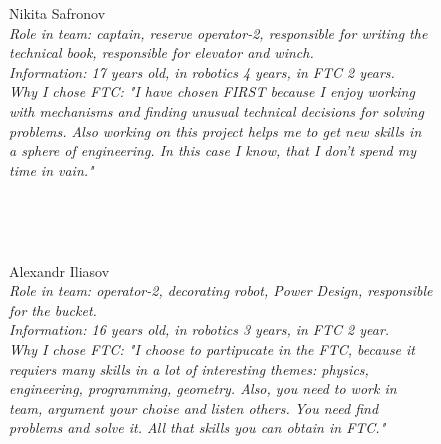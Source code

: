 \begin{figure}[H]
	\begin{minipage}{0.47\linewidth}
		Nikita Safronov\\
		\emph{Role in team: captain, reserve operator-2, responsible for writing the technical book, responsible for elevator and winch.\\}
		\emph{Information: 17 years old, in robotics 4 years, in FTC 2 years.\\} 
		\emph{Why I chose FTC: "I have chosen FIRST because I enjoy working with mechanisms and finding unusual technical decisions for solving problems. Also working on this project helps me to get new skills in a sphere of engineering. In this case I know, that I don't spend my time in vain."}				
	\end{minipage}
	\hfill
	\begin{minipage}{0.47\linewidth}
		\\
	\end{minipage}
\end{figure}

\begin{figure}[H]
	\begin{minipage}[h]{0.47\linewidth}
		\\
	\end{minipage}
	\hfill
	\begin{minipage}[h]{0.47\linewidth}
		Alexandr Iliasov \\
		\emph{Role in team: operator-2, decorating robot, Power Design, responsible for the bucket.\\}
		\emph{Information: 16 years old, in robotics 3 years, in FTC 2 year. \\}
		\emph{Why I chose FTC: "I choose to partipucate in the FTC, because it requiers many skills in a lot of interesting themes: physics, engineering, programming, geometry. Also, you need to work in team, argument your choise and listen others. You need find problems and solve it. All that skills you can obtain in FTC."}		
	\end{minipage}
	\vfill
\end{figure}

